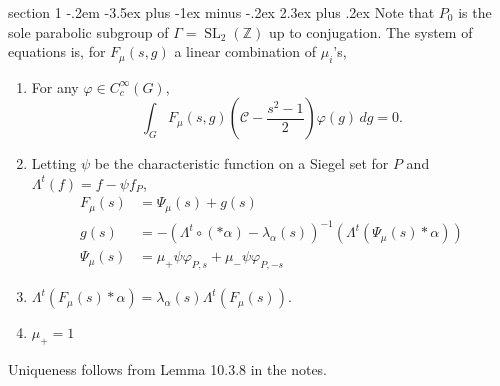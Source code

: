 \documentclass[12pt]{article}
\makeatletter
\theoremstyle{norm}
\newcommand{\Z}[0]{\mathbb{Z}}
\providecommand{\cal}[1]{\mathcal{#1}}
\renewcommand{\cal}[1]{\mathcal{#1}}
\newcommand{\al}[0]{\alpha}
\newcommand{\Ga}[0]{\Gamma}
\newcommand{\de}[0]{\delta}
\newcommand{\la}[0]{\lambda}
\newcommand{\La}[0]{\Lambda}
\newcommand{\ph}[0]{\varphi}
\newcommand{\pa}[1]{\left( {#1} \right)}
\newcommand{\SL}{\operatorname{SL}}
\newcommand{\iy}[0]{\infty}
\newenvironment{problem}{\@startsection
       {section}
       {1}
       {-.2em}
       {-3.5ex plus -1ex minus -.2ex}
       {2.3ex plus .2ex}
       {\pagebreak[3]%
       \large\bf\noindent{Problem }
       }
       }
       {
       }
\makeatother
\begin{document}
\begin{problem}{\it }
Note that $P_0$ is the sole parabolic subgroup of $\Ga=\SL_2(\Z)$ up to conjugation. 
The system of equations is, for $F_{\mu}(s,g)$ a linear combination of $\mu_i$'s,
\begin{enumerate}
\item For any $\ph\in C_c^{\iy}(G)$,
\[
\int_G F_{\mu}(s,g)\pa{\cal C-\frac{s^2-1}{2}}\ph(g)\,dg=0.
\]
\item Letting $\psi$ be the characteristic function on a Siegel set for $P$ and $\La^t(f)=f-\psi f_P$,
\begin{align*}
F_{\mu}(s)&=\Psi_{\mu}(s)+g(s)\\
g(s)&=-(\La^t\circ (*\al)-\la_{\al}(s))^{-1}(\La^t (\Psi_{\mu} (s) * \al))\\
\Psi_{\mu}(s)&=\mu_+\psi\ph_{P,s} +\mu_-\psi\ph_{P,-s}
\end{align*}
\item
$
\La^t(F_{\mu}(s)*\al)=\la_{\al}(s) \La^t (F_{\mu}(s)).
$
\item $\mu_+=1$
\end{enumerate}
Uniqueness follows from Lemma 10.3.8 in the notes.
\end{problem}
\end{document}
